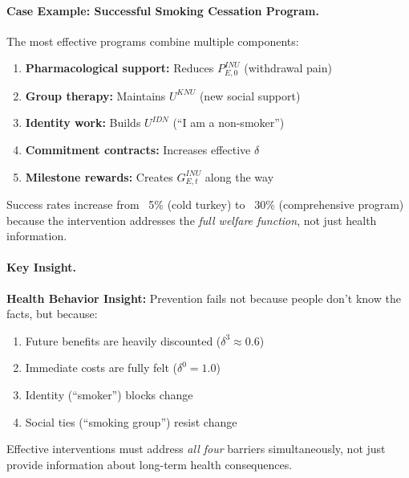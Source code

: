 \paragraph{Case Example: Successful Smoking Cessation Program.}
The most effective programs combine multiple components:

\begin{enumerate}
\item \textbf{Pharmacological support:} Reduces $P^{INU}_{E,0}$ (withdrawal pain)
\item \textbf{Group therapy:} Maintains $U^{KNU}$ (new social support)
\item \textbf{Identity work:} Builds $U^{IDN}$ (``I am a non-smoker'')
\item \textbf{Commitment contracts:} Increases effective $\delta$
\item \textbf{Milestone rewards:} Creates $G^{INU}_{E,t}$ along the way
\end{enumerate}

Success rates increase from ~5\% (cold turkey) to ~30\% (comprehensive program)
because the intervention addresses the \emph{full welfare function}, not just 
health information.

\paragraph{Key Insight.}
\begin{tcolorbox}[colback=yellow!10!white, colframe=yellow!50!black]
\textbf{Health Behavior Insight:}
Prevention fails not because people don't know the facts, but because:
\begin{enumerate}
\item Future benefits are heavily discounted ($\delta^3 \approx 0.6$)
\item Immediate costs are fully felt ($\delta^0 = 1.0$)
\item Identity (``smoker'') blocks change
\item Social ties (``smoking group'') resist change
\end{enumerate}
Effective interventions must address \emph{all four} barriers simultaneously,
not just provide information about long-term health consequences.
\end{tcolorbox}

